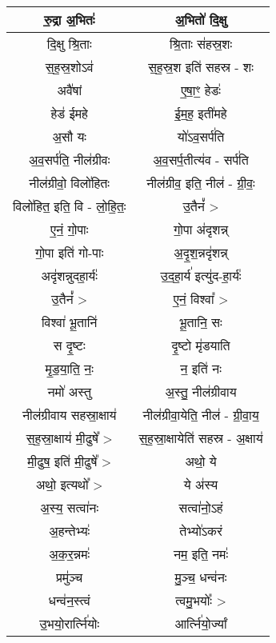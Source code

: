 {\begin{longtable}{|c|c|}
\hline
रु॒द्रा अ॒भितः॑               & अ॒भितो॑ दि॒क्षु\\
\hline
दि॒क्षु श्रि॒ताः              & श्रि॒ताः स॑हस्र॒शः\\
\hline
स॒ह॒स्र॒शोऽव॑                 & स॒ह॒स्र॒श इति॑ सहस्र - शः\\
\hline
अवै॑षां                     & ए॒षा॒ꣳ॒ हेडः॑\\
\hline
हेड॑ ईमहे                   & ई॒म॒ह॒ इती॑महे\\
\hline
अ॒सौ यः                   & यो॑ऽव॒सर्प॑ति\\
\hline
अ॒व॒सर्प॑ति॒ नील॑ग्रीवः         & अ॒व॒सर्प॒तीत्य॑व - सर्प॑ति\\
\hline
नील॑ग्रीवो॒ विलो॑हितः        & नील॑ग्रीव॒ इति॒ नील॑ - ग्री॒वः॒\\
\hline
विलो॑हित॒ इति॒ वि - लो॒हि॒तः॒  & उ॒तैनं᳚ >\\
\hline
ए॒नं॒ गो॒पाः                 & गो॒पा अ॑दृशन्न्\\
\hline
गो॒पा इति॑ गो-पाः          & अ॒दृ॒श॒न्नदृ॑शन्न्\\
\hline
अदृ॑शन्नुदहा॒र्यः॑              & उ॒द॒हा॒र्य॑ इत्यु॑द-हा॒र्यः॑\\
\hline
उ॒तैनं᳚ >                    & ए॒नं॒ विश्वा᳚ >\\
\hline
विश्वा॑ भू॒तानि॑              & भू॒तानि॒ सः\\
\hline
स दृ॒ष्टः                   & दृ॒ष्टो मृ॑डयाति\\
\hline
मृ॒ड॒या॒ति॒ नः॒                & न॒ इति॑ नः\\
\hline
नमो॑ अस्तु                  & अ॒स्तु॒ नील॑ग्रीवाय\\
\hline
नील॑ग्रीवाय सहस्रा॒क्षाय॑      & नील॑ग्रीवा॒येति॒ नील॑ - ग्री॒वा॒य॒\\
\hline
स॒ह॒स्रा॒क्षाय॑ मी॒ढुषे᳚ >         & स॒ह॒स्रा॒क्षायेति॑ सहस्र - अ॒क्षाय॑\\
\hline
मी॒ढुष॒ इति॑ मी॒ढुषे᳚ >          & अथो॒ ये\\
\hline
अथो॒ इत्यथो᳚ >              & ये अ॑स्य\\
\hline
अ॒स्य॒ सत्वा॑नः               & सत्वा॑नो॒ऽहं\\
\hline
अ॒हन्तेभ्यः॑                  & तेभ्यो॑ऽकरं\\
\hline
अ॒क॒र॒न्नमः॑                  & नम॒ इति॒ नमः॑\\
\hline
प्रमु॑ञ्च                    & मु॒ञ्च॒ धन्व॑नः\\
\hline
धन्व॑न॒स्त्वं                  & त्वमु॒भयोः᳚ >\\
\hline
उ॒भयो॒रार्त्नि॑योः            & आर्त्नि॑यो॒र्ज्यां\\

\end{longtable}}

